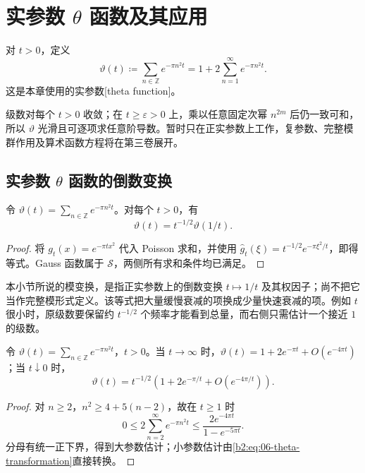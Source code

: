 \section{实参数 \texorpdfstring{\(\theta\)}{\AnalysisPdfTheta} 函数及其应用}
\label{b2:sec:0603}

\begin{definition}\label{b2:def:06-theta}
对 \(t>0\)，定义
\[
 \vartheta(t)\coloneqq\sum_{n\in\mathbb Z}e^{-\pi n^2t}
 =1+2\sum_{n=1}^\infty e^{-\pi n^2t}.
\]
这是本章使用的实参数[theta function]。
\end{definition}

级数对每个 \(t>0\) 收敛；在 \(t\geq\varepsilon>0\) 上，乘以任意固定次幂 \(n^{2m}\) 后仍一致可和，所以 \(\vartheta\) 光滑且可逐项求任意阶导数。暂时只在正实参数上工作，复参数、完整模群作用及算术函数方程将在第三卷展开。

\subsection{实参数 \texorpdfstring{\(\theta\)}{\AnalysisPdfTheta} 函数的倒数变换}
\label{b2:subsec:060301}

\begin{theorem}\label{b2:thm:06-theta-transformation}
令 \(\vartheta(t)=\sum_{n\in\mathbb Z}e^{-\pi n^2t}\)。对每个 \(t>0\)，有
\begin{equation}\label{b2:eq:06-theta-transformation}
 \vartheta(t)=t^{-1/2}\vartheta(1/t).
\end{equation}
\end{theorem}
\begin{proof}
将 \(g_t(x)=e^{-\pi t x^2}\) 代入 Poisson 求和，并使用 \(\widehat g_t(\xi)=t^{-1/2}e^{-\pi\xi^2/t}\)，即得等式。Gauss 函数属于 \(\mathcal S\)，两侧所有求和条件均已满足。
\end{proof}

本小节所说的模变换，是指正实参数上的倒数变换 \(t\mapsto1/t\) 及其权因子；尚不把它当作完整模形式定义。该等式把大量缓慢衰减的项换成少量快速衰减的项。例如 \(t\) 很小时，原级数要保留约 \(t^{-1/2}\) 个频率才能看到总量，而右侧只需估计一个接近 \(1\) 的级数。

\begin{corollary}\label{b2:cor:06-theta-asymptotics}
令 \(\vartheta(t)=\sum_{n\in\mathbb Z}e^{-\pi n^2t}\)，\(t>0\)。当 \(t\to\infty\) 时，\(\vartheta(t)=1+2e^{-\pi t}+O(e^{-4\pi t})\)；当 \(t\downarrow0\) 时，
\[
 \vartheta(t)=t^{-1/2}\left(1+2e^{-\pi/t}+O(e^{-4\pi/t})\right).
\]
\end{corollary}
\begin{proof}
对 \(n\geq2\)，\(n^2\geq4+5(n-2)\)，故在 \(t\geq1\) 时
\[
 0\leq2\sum_{n=2}^\infty e^{-\pi n^2t}
 \leq\dfrac{2e^{-4\pi t}}{1-e^{-5\pi t}}.
\]
分母有统一正下界，得到大参数估计；小参数估计由\eqref{b2:eq:06-theta-transformation}直接转换。
\end{proof}

